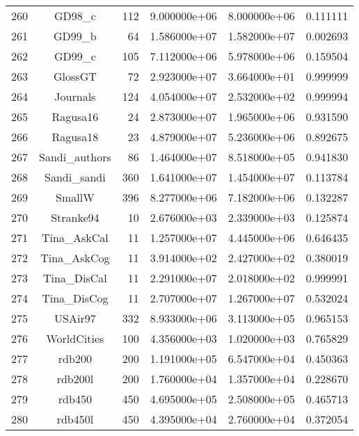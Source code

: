 \documentclass[8pt]{report}
\begin{document}
\begin{table*}
\begin{tabular}{|l|c|r|r|r|r|}
260 &                   GD98\_c &   112 &  9.000000e+06 &  8.000000e+06 &  0.111111 \\
261 &                   GD99\_b &    64 &  1.586000e+07 &  1.582000e+07 &  0.002693 \\
262 &                   GD99\_c &   105 &  7.112000e+06 &  5.978000e+06 &  0.159504 \\
263 &                  GlossGT &    72 &  2.923000e+07 &  3.664000e+01 &  0.999999 \\
264 &                 Journals &   124 &  4.054000e+07 &  2.532000e+02 &  0.999994 \\
265 &                 Ragusa16 &    24 &  2.873000e+07 &  1.965000e+06 &  0.931590 \\
266 &                 Ragusa18 &    23 &  4.879000e+07 &  5.236000e+06 &  0.892675 \\
267 &            Sandi\_authors &    86 &  1.464000e+07 &  8.518000e+05 &  0.941830 \\
268 &              Sandi\_sandi &   360 &  1.641000e+07 &  1.454000e+07 &  0.113784 \\
269 &                   SmallW &   396 &  8.277000e+06 &  7.182000e+06 &  0.132287 \\
270 &                Stranke94 &    10 &  2.676000e+03 &  2.339000e+03 &  0.125874 \\
271 &              Tina\_AskCal &    11 &  1.257000e+07 &  4.445000e+06 &  0.646435 \\
272 &              Tina\_AskCog &    11 &  3.914000e+02 &  2.427000e+02 &  0.380019 \\
273 &              Tina\_DisCal &    11 &  2.291000e+07 &  2.018000e+02 &  0.999991 \\
274 &              Tina\_DisCog &    11 &  2.707000e+07 &  1.267000e+07 &  0.532024 \\
275 &                  USAir97 &   332 &  8.933000e+06 &  3.113000e+05 &  0.965153 \\
276 &              WorldCities &   100 &  4.356000e+03 &  1.020000e+03 &  0.765829 \\
277 &                   rdb200 &   200 &  1.191000e+05 &  6.547000e+04 &  0.450363 \\
278 &                  rdb200l &   200 &  1.760000e+04 &  1.357000e+04 &  0.228670 \\
279 &                   rdb450 &   450 &  4.695000e+05 &  2.508000e+05 &  0.465713 \\
280 &                  rdb450l &   450 &  4.395000e+04 &  2.760000e+04 &  0.372054 \\

\end{tabular}
\end{table*}
\end{document}
